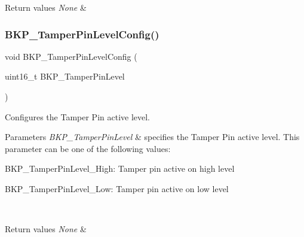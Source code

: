 \begin{DoxyRetVals}{Return values}
{\em None} & \\
\hline
\end{DoxyRetVals}
\mbox{\label{group___b_k_p___private___functions_gae216446d641d075fb575ce6dbe2ff4c1}} 
\subsubsection{\texorpdfstring{BKP\_TamperPinLevelConfig()}{BKP\_TamperPinLevelConfig()}}
{\footnotesize\ttfamily void B\+K\+P\+\_\+\+Tamper\+Pin\+Level\+Config (\begin{DoxyParamCaption}\item[{uint16\+\_\+t}]{B\+K\+P\+\_\+\+Tamper\+Pin\+Level }\end{DoxyParamCaption})}



Configures the Tamper Pin active level. 


\begin{DoxyParams}{Parameters}
{\em B\+K\+P\+\_\+\+Tamper\+Pin\+Level} & specifies the Tamper Pin active level. This parameter can be one of the following values\+: \begin{DoxyItemize}
\item B\+K\+P\+\_\+\+Tamper\+Pin\+Level\+\_\+\+High\+: Tamper pin active on high level \item B\+K\+P\+\_\+\+Tamper\+Pin\+Level\+\_\+\+Low\+: Tamper pin active on low level \end{DoxyItemize}
\\
\hline
\end{DoxyParams}

\begin{DoxyRetVals}{Return values}
{\em None} & \\
\hline
\end{DoxyRetVals}
\mbox{\label{group___b_k_p___private___functions_ga18d220387db651b3cb71fad5c092e041}} 
